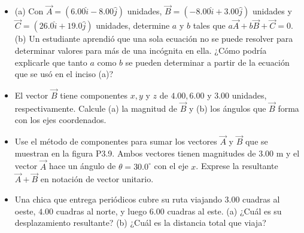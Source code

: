 \documentclass[11pt,a4paper]{article}
\begin{document}
\begin{itemize}
    \item[\textbf{23.}] (a) Con $\vec{A} = (6.00\hat{i} - 8.00\hat{j})$ unidades, $\vec{B} = (-8.00\hat{i} + 3.00\hat{j})$ unidades y $\vec{C} = (26.0\hat{i} + 19.0\hat{j})$ unidades, determine $a$ y $b$ tales que $a\vec{A} + b\vec{B} + \vec{C} = 0$. (b) Un estudiante aprendió que una sola ecuación no se puede resolver para determinar valores para más de una incógnita en ella. ¿Cómo podría explicarle que tanto $a$ como $b$ se pueden determinar a partir de la ecuación que se usó en el inciso (a)?
    \vspace*{6cm}

    \item[\textbf{24.}] El vector $\vec{B}$ tiene componentes $x, y$ y $z$ de $4.00, 6.00$ y $3.00$ unidades, respectivamente. Calcule (a) la magnitud de $\vec{B}$ y (b) los ángulos que $\vec{B}$ forma con los ejes coordenados.
    \vspace*{6cm}

    \item[\textbf{25.}] Use el método de componentes para sumar los vectores $\vec{A}$ y $\vec{B}$ que se muestran en la figura P3.9. Ambos vectores tienen magnitudes de $3.00 \text{ m}$ y el vector $\vec{A}$ hace un ángulo de $\theta = 30.0^\circ$ con el eje $x$. Exprese la resultante $\vec{A} + \vec{B}$ en notación de vector unitario.
    \vspace*{6cm}

    \item[\textbf{26.}] Una chica que entrega periódicos cubre su ruta viajando $3.00$ cuadras al oeste, $4.00$ cuadras al norte, y luego $6.00$ cuadras al este. (a) ¿Cuál es su desplazamiento resultante? (b) ¿Cuál es la distancia total que viaja?
    \vspace*{6cm}
\end{itemize}

\newpage
\end{document}
